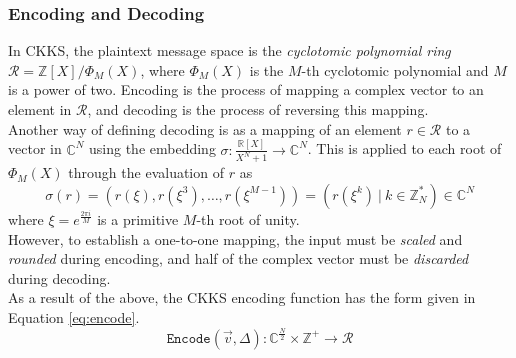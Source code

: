 \setlength{\leftskip}{0cm}
\subsubsection{Encoding and Decoding}
\setlength{\leftskip}{0.5cm}
\indent \indent
In CKKS, the plaintext message space is the \textit{cyclotomic polynomial ring} $\mathcal{R} = \mathbb{Z}[X] / \Phi_M(X)$, where $\Phi_M(X)$ is the $M$-th cyclotomic polynomial and $M$ is a power of two. Encoding is the process of mapping a complex vector to an element in $\mathcal{R}$, and decoding is the process of reversing this mapping.
\smallskip \\ \indent
Another way of defining decoding is as a mapping of an element $r \in \mathcal{R}$ to a vector in $\mathbb{C}^N$ using the embedding $\sigma : \frac{\mathbb{R}[X]}{X^N + 1} \rightarrow \mathbb{C}^N$. This is applied to each root of $\Phi_M(X)$ through the evaluation of $r$ as
\begin{equation}
    \sigma(r) = (r(\xi), r(\xi^3), \ldots, r(\xi^{M-1})) = (r(\xi^k) \: | \: k \in \mathbb{Z}^*_N) \in \mathbb{C}^N
\end{equation}
where $\xi = e^{\frac{2 \pi i}{M}}$ is a primitive $M$-th root of unity.
\smallskip \\ \indent
However, to establish a one-to-one mapping, the input must be \textit{scaled} and \textit{rounded} during encoding, and half of the complex vector must be \textit{discarded} during decoding.
\smallskip \\ \indent
As a result of the above, the CKKS encoding function has the form given in Equation \ref{eq:encode}.
\begin{equation}
    \label{eq:encode}
    \texttt{Encode}(\vec{v}, \Delta) : \mathbb{C}^\frac{N}{2} \times \mathbb{Z}^+ \rightarrow \mathcal{R}
\end{equation}

\setlength{\leftskip}{0cm}
